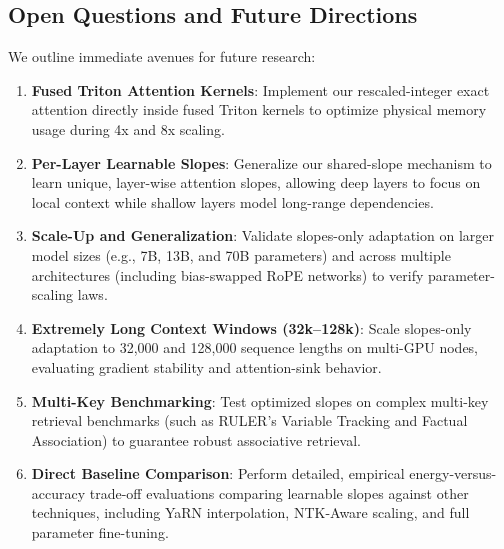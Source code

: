 \documentclass[11pt,journal,compsoc]{IEEEtran}
\begin{document}
\subsection{Open Questions and Future Directions}
We outline immediate avenues for future research:
\begin{enumerate}
    \item \textbf{Fused Triton Attention Kernels}: Implement our rescaled-integer exact attention directly inside fused Triton kernels to optimize physical memory usage during 4x and 8x scaling.
    \item \textbf{Per-Layer Learnable Slopes}: Generalize our shared-slope mechanism to learn unique, layer-wise attention slopes, allowing deep layers to focus on local context while shallow layers model long-range dependencies.
    \item \textbf{Scale-Up and Generalization}: Validate slopes-only adaptation on larger model sizes (e.g., 7B, 13B, and 70B parameters) and across multiple architectures (including bias-swapped RoPE networks) to verify parameter-scaling laws.
    \item \textbf{Extremely Long Context Windows (32k--128k)}: Scale slopes-only adaptation to 32,000 and 128,000 sequence lengths on multi-GPU nodes, evaluating gradient stability and attention-sink behavior.
    \item \textbf{Multi-Key Benchmarking}: Test optimized slopes on complex multi-key retrieval benchmarks (such as RULER's Variable Tracking and Factual Association) to guarantee robust associative retrieval.
    \item \textbf{Direct Baseline Comparison}: Perform detailed, empirical energy-versus-accuracy trade-off evaluations comparing learnable slopes against other techniques, including YaRN interpolation, NTK-Aware scaling, and full parameter fine-tuning.
\end{enumerate}
\end{document}
